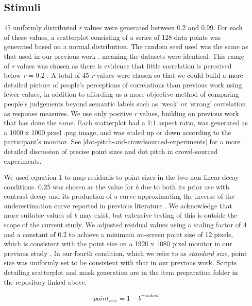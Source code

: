 \documentclass{vgtc}                          %
\begin{document}
\hypertarget{stimuli}{%
\subsection{Stimuli}\label{stimuli}}

45 uniformly distributed \emph{r} values were generated between 0.2 and 0.99.
For each of these values, a scatterplot consisting of a series of 128 data points
was generated based on a normal distribution. The random seed used was the same
as that used in our previous work \cite{strain_2023}, meaning the datasets were
identical. This range of \emph{r} values was chosen as there is evidence
that little correlation is perceived below \emph{r} = 0.2 \cite{strahan_1978, bobko_1979, cleveland_1982}.
A total of 45 \emph{r} values were chosen so that we could build a more detailed picture
of people's perceptions of correlations than previous work using fewer values,
in addition to affording us a more objective method of comparing people's judgements
beyond semantic labels such as `weak' or `strong' correlation as response measures.
We use only positive \emph{r} values, building on previous work that has done the same.
Each scatterplot had a 1:1 aspect ratio, was generated as a 1000 x 1000 pixel .png image, and was
scaled up or down according to the participant's monitor. See
\autoref{dot-pitch-and-crowdsourced-experiments} for a more detailed discussion of
precise point sizes and dot pitch in crowd-sourced experiments.

We used equation 1 to map residuals
to point sizes in the two non-linear decay conditions. 0.25 was chosen as the
value for \emph{b} due to both its prior use with contrast decay \cite{strain_2023} and its
production of a curve approximating the inverse of the underestimation curve reported
in previous literature \cite{rensink_2017}. We acknowledge that more suitable values of
\emph{b} may exist, but extensive testing of this is outside the scope of the current study.
We adjusted residual values using a scaling factor of 4 and a
constant of 0.2 to achieve a minimum on-screen point size of 12 pixels, which
is consistent with the point size on a 1920 x 1080 pixel monitor in our previous study
\cite{strain_2023}. In our fourth condition,
which we refer to as \emph{standard size}, point size was uniformly
set to be consistent with that in our previous
work. Scripts detailing scatterplot and mask generation are in the item
preparation folder in the repository linked above.

\begin{equation}
  point_{size} = 1 - b^{residual}
\end{equation}
\end{document}
